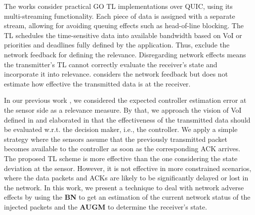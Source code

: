 The works \cite{chiariotti2020quic, shi2019dtp} consider practical GO TL implementations over QUIC, using its multi-streaming functionality. Each piece of data is assigned with a separate stream, allowing for avoiding queuing effects such as head-of-line blocking. The TL schedules the time-sensitive data into available bandwidth based on VoI \cite{chiariotti2020quic} or priorities and deadlines \cite{shi2019dtp} fully defined by the application. Thus, \cite{chiariotti2020quic, shi2019dtp} exclude the network feedback for defining the relevance. Disregarding network effects means the transmitter's TL cannot correctly evaluate the receiver's state and incorporate it into relevance. \cite{jiang2020revealing} considers the network feedback but does not estimate how effective the transmitted data is at the receiver.


In our previous work \cite{kutsevol2023experimental}, we considered the expected controller estimation error at the sensor side as a relevance measure. By that, we approach the vision of VoI defined in \cite{alawad2022value} and elaborated in \cite{holm2023goal} that the effectiveness of the transmitted data should be evaluated w.r.t. the decision maker, i.e., the controller. We apply a simple strategy where the sensors assume that the previously transmitted packet becomes available to the controller as soon as the corresponding ACK arrives. The proposed TL scheme is more effective than the one considering the state deviation at the sensor. However, it is not effective in more constrained scenarios, where the data packets and ACKs are likely to be significantly delayed or lost in the network. In this work, we present a technique to deal with network adverse effects by using the \textbf{BN}  to get an estimation of the current network status of the injected packets and the \textbf{AUGM} to determine the receiver's state. 

